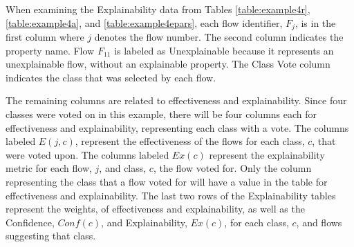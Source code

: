 \begin{table}[H]
    \renewcommand{\arraystretch}{1.3}
     \label{table:exexample4a}
    \begin{center}
    \end{center}
\end{table}

When examining the Explainability data from Tables \ref{table:example4r},
\ref{table:example4a}, and \ref{table:example4epars}, each flow identifier,
$F_j$, is in the first column where $j$ denotes the flow number.  The second
column indicates the property name. Flow $F_{11}$ is labeled as Unexplainable
because it represents an unexplainable flow, without an explainable property.
The Class Vote column indicates the class that was selected by each flow.

The remaining columns are related to effectiveness and explainability.  Since
four classes were voted on in this example, there will be four columns each for
effectiveness and explainability, representing each class with a vote. The
columns labeled $E(j,c)$, represent the effectiveness of the flows for each
class, $c$, that were voted upon. The columns labeled $Ex(c)$ represent the
explainability metric for each flow, $j$, and class, $c$, the flow voted for.
Only the column representing the class that a flow voted for will have a value
in the table for effectiveness and explainability.  The last two rows of the
Explainability tables represent the weights, of effectiveness and
explainability, as well as the Confidence, $Conf(c)$, and Explainability,
$Ex(c)$, for each class, $c$, and flows suggesting that class.


